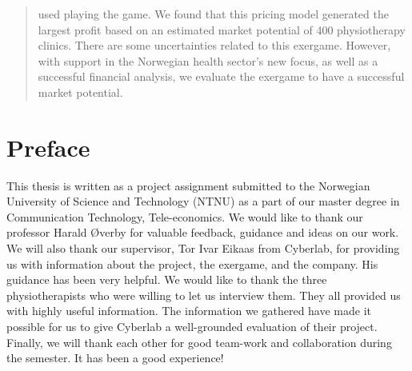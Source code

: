 \documentclass[b5paper,twoside,openright,11pt]{report}
\begin{document}
\begin{abstract}
used playing the game. We found that this pricing model generated the largest profit based on an estimated market potential of 400 physiotherapy clinics. There are some uncertainties related to this exergame. However, with support in the Norwegian health sector's new focus, as well as a successful financial analysis, we evaluate the exergame to have a successful market potential.
\end{abstract}
\cleardoublepage
\chapter*{Preface}
This thesis is written as a project assignment submitted to the Norwegian University of Science and Technology (NTNU) as a part of our master degree in Communication Technology, Tele-economics. 
We would like to thank our professor Harald Øverby for valuable feedback, guidance and ideas on our work. We will also thank our supervisor, Tor Ivar Eikaas from Cyberlab, for providing us with information about the project, the exergame, and the company. His guidance has been very helpful. We would like to thank the three physiotherapists who were willing to let us interview them. They all provided us with highly useful information. The information we gathered have made it possible for us to give Cyberlab a well-grounded evaluation of their project.  
Finally, we will thank each other for good team-work and collaboration during the semester. It has been a good experience! 

\cleardoublepage
{}
\tableofcontents
\cleardoublepage

\cleardoublepage
\listoffigures
\cleardoublepage
\listoftables
\cleardoublepage
{}
\pagestyle{fancy}
\fancyhead[LE]{\thepage}
\fancyhead[RE]{\leftmark}
\fancyhead[RO]{\thepage}
\fancyhead[LO]{\rightmark}
\fancyfoot{}

\cleardoublepage

\cleardoublepage

\cleardoublepage

\cleardoublepage

\cleardoublepage

\cleardoublepage

\cleardoublepage

\cleardoublepage

\cleardoublepage

\cleardoublepage


\cleardoublepage

\end{document}
